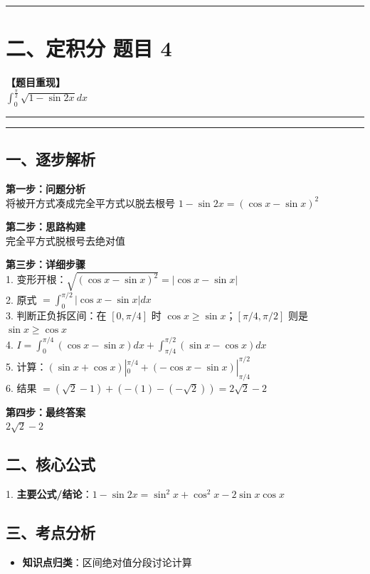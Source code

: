 ﻿\documentclass[12pt, a4paper]{ctexart}
\newcommand{\TopSeparator}{
    \par\noindent\rule{\textwidth}{1.5pt}\vspace{0.5em}
}
\newcommand{\AnalysisSeparator}{
    \par\noindent\rule{\textwidth}{0.5pt}\vspace{0.2em}\hrule\vspace{0.5em}
}
\newenvironment{RedAnalysis}{
    \par
    \color{red} 
}{
    \par
    \color{black} 
}
\begin{document}
\vspace{2em}

\TopSeparator
\section*{二、定积分 题目 4}

\textbf{【题目重现】} \\
$\int_{0}^{\frac{\pi}{2}} \sqrt{1-\sin 2x} dx$

\AnalysisSeparator

\begin{RedAnalysis}

	\subsection*{一、逐步解析}

	\textbf{第一步：问题分析} \\
	将被开方式凑成完全平方式以脱去根号 $1-\sin 2x = (\cos x - \sin x)^2$

	\textbf{第二步：思路构建} \\
	完全平方式脱根号去绝对值

	\textbf{第三步：详细步骤} \\
	1. 变形开根：$\sqrt{(\cos x - \sin x)^2} = |\cos x - \sin x|$ \\ 
	2. 原式 $= \int_0^{\pi/2} |\cos x - \sin x| dx$ \\ 
	3. 判断正负拆区间：在 $[0, \pi/4]$ 时 $\cos x \ge \sin x$；$[\pi/4, \pi/2]$ 则是 $\sin x \ge \cos x$ \\ 
	4. $I = \int_0^{\pi/4} (\cos x - \sin x)dx + \int_{\pi/4}^{\pi/2} (\sin x - \cos x)dx$ \\ 
	5. 计算：$(\sin x + \cos x)|_0^{\pi/4} + (-\cos x - \sin x)|_{\pi/4}^{\pi/2}$ \\ 
	6. 结果 $= (\sqrt{2}-1) + (-(1) - (-\sqrt{2})) = 2\sqrt{2}-2$

	\textbf{第四步：最终答案} \\
	$2\sqrt{2}-2$

	\subsection*{二、核心公式}
	1. \textbf{主要公式/结论}：$1-\sin 2x = \sin^2 x + \cos^2 x - 2\sin x \cos x$

	\subsection*{三、考点分析}
	\begin{itemize}
		\item \textbf{知识点归类}：区间绝对值分段讨论计算
	\end{itemize}

\end{RedAnalysis}
\end{document}
